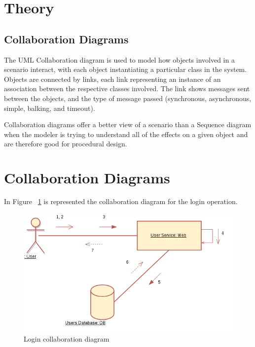 \documentclass[12pt,a4paper,titlepage]{article}
\begin{document}
\section{Theory}

\subsection{Collaboration Diagrams}
The UML Collaboration diagram is used to model how objects involved in a scenario interact, with each object instantiating a particular class in the system. Objects are connected by links, each link representing an instance of an association between the respective classes involved. The link shows messages sent between the objects, and the type of message passed (synchronous, asynchronous, simple, balking, and timeout).\par
Collaboration diagrams offer a better view of a scenario than a Sequence diagram when the modeler is trying to understand all of the effects on a given object and are therefore good for procedural design.
\clearpage

\section{Collaboration Diagrams}
In Figure ~\ref{fig:login} is represented the collaboration diagram for the login operation.
\begin{figure}[H]
	\includegraphics[width=\textwidth]{login}
	\caption{Login collaboration diagram}
	\centering
	\label{fig:login}
\end{figure}
\end{document}
